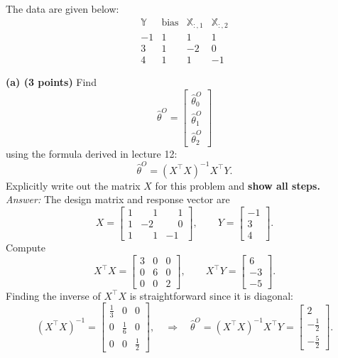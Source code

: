 \documentclass[11pt]{article}
\begin{document}
\medskip
The data are given below:
\[
\begin{array}{c|ccc}
\mathbb{Y}  & \text{bias} & \mathbb{X} _{:,1} & \mathbb{X} _{:,2}\\ \hline
-1 & 1 & 1  & 1\\
 3 & 1 & -2 & 0\\
 4 & 1 & 1  & -1
\end{array}
\]

\medskip
\noindent\textbf{(a) (3 points)} Find
\[
\hat{\theta}^{O}=
\begin{bmatrix}
\hat{\theta}^{O}_0\\
\hat{\theta}^{O}_1\\
\hat{\theta}^{O}_2
\end{bmatrix}
\]
using the formula derived in lecture 12:
\[
\hat{\theta}^{O}=(X^\top X)^{-1}X^\top Y.
\]
Explicitly write out the matrix $X$ for this problem and \textbf{show all steps.}
\medskip
\\\noindent\textit{Answer:}
The design matrix and response vector are
\[
X=
\begin{bmatrix}
1 & \phantom{-}1 & \phantom{-}1\\
1 & -2 & \phantom{-}0\\
1 & \phantom{-}1 & -1
\end{bmatrix},
\qquad
Y=\begin{bmatrix}-1\\3\\4\end{bmatrix}.
\]
Compute
\[
X^\top X=
\begin{bmatrix}
3 & 0 & 0\\
0 & 6 & 0\\
0 & 0 & 2
\end{bmatrix},
\qquad
X^\top Y=
\begin{bmatrix}
6\\[2pt]-3\\[2pt]-5
\end{bmatrix}.
\]
Finding the inverse of $X^\top X$ is straightforward since it is diagonal:
\[
(X^\top X)^{-1}=
\begin{bmatrix}
\frac13 & 0 & 0\\[2pt]
0 & \frac16 & 0\\[2pt]
0 & 0 & \frac12
\end{bmatrix},
\quad
\Rightarrow\quad
\hat\theta^{O}
=(X^\top X)^{-1}X^\top Y
=
\begin{bmatrix}
2\\[2pt]
-\tfrac12\\[2pt]
-\tfrac52
\end{bmatrix}.
\]
\end{document}
